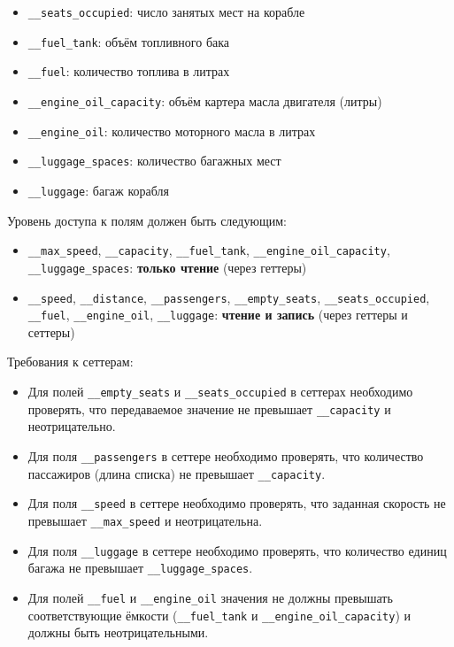 \begin{enumerate}
\begin{itemize}
    \item \texttt{\_\_seats\_occupied}: число занятых мест на корабле  
    \item \texttt{\_\_fuel\_tank}: объём топливного бака  
    \item \texttt{\_\_fuel}: количество топлива в литрах  
    \item \texttt{\_\_engine\_oil\_capacity}: объём картера масла двигателя (литры)  
    \item \texttt{\_\_engine\_oil}: количество моторного масла в литрах  
    \item \texttt{\_\_luggage\_spaces}: количество багажных мест  
    \item \texttt{\_\_luggage}: багаж корабля  
\end{itemize}
Уровень доступа к полям должен быть следующим:
\begin{itemize}
    \item \texttt{\_\_max\_speed}, \texttt{\_\_capacity}, \texttt{\_\_fuel\_tank}, \texttt{\_\_engine\_oil\_capacity}, \texttt{\_\_luggage\_spaces}: \textbf{только чтение} (через геттеры)  
    \item \texttt{\_\_speed}, \texttt{\_\_distance}, \texttt{\_\_passengers}, \texttt{\_\_empty\_seats}, \texttt{\_\_seats\_occupied}, \texttt{\_\_fuel}, \texttt{\_\_engine\_oil}, \texttt{\_\_luggage}: \textbf{чтение и запись} (через геттеры и сеттеры)
\end{itemize}
Требования к сеттерам:
\begin{itemize}
    \item Для полей \texttt{\_\_empty\_seats} и \texttt{\_\_seats\_occupied} в сеттерах необходимо проверять, что передаваемое значение не превышает \texttt{\_\_capacity} и неотрицательно.  
    \item Для поля \texttt{\_\_passengers} в сеттере необходимо проверять, что количество пассажиров (длина списка) не превышает \texttt{\_\_capacity}.  
    \item Для поля \texttt{\_\_speed} в сеттере необходимо проверять, что заданная скорость не превышает \texttt{\_\_max\_speed} и неотрицательна.  
    \item Для поля \texttt{\_\_luggage} в сеттере необходимо проверять, что количество единиц багажа не превышает \texttt{\_\_luggage\_spaces}.
    \item Для полей \texttt{\_\_fuel} и \texttt{\_\_engine\_oil} значения не должны превышать соответствующие ёмкости (\texttt{\_\_fuel\_tank} и \texttt{\_\_engine\_oil\_capacity}) и должны быть неотрицательными.

\end{itemize}
\end{enumerate}
